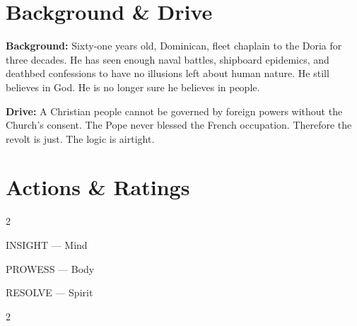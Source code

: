 \clearpage



\section*{Background \& Drive}
\begin{rulebox}{}
  \textbf{Background:} Sixty-one years old, Dominican, fleet chaplain to the Doria
  for three decades. He has seen enough naval battles, shipboard epidemics, and
  deathbed confessions to have no illusions left about human nature.
  He still believes in God. He is no longer sure he believes in people.

  \medskip\noindent\textcolor{DoriaBlue}{\textbf{Drive:}} A Christian people cannot
  be governed by foreign powers without the Church's consent. The Pope never blessed
  the French occupation. Therefore the revolt is just. The logic is airtight.
\end{rulebox}

\section*{Actions \& Ratings}
\begin{multicols}{2}
\begin{attributoblock}[DoriaBlue]{INSIGHT --- Mind}
\end{attributoblock}
\begin{attributoblock}[DoriaBlue]{PROWESS --- Body}
\end{attributoblock}
\end{multicols}
\begin{attributoblock}[DoriaBlue]{RESOLVE --- Spirit}
  \begin{multicols}{2}
  \end{multicols}
\end{attributoblock}

